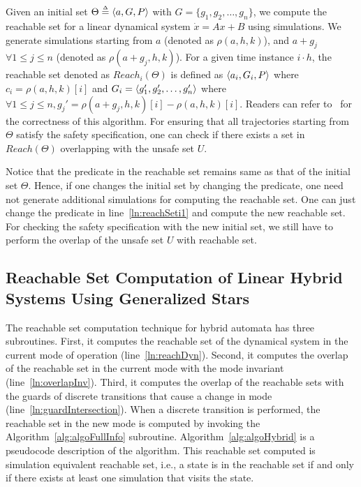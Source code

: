 Given an initial set $\Theta \deq \tup{a, G, P}$ with $G = \{g_1, g_2, \ldots, g_n\}$, we compute the reachable set for a linear dynamical system $\dot{x} = Ax + B$ using simulations.
%
We generate simulations starting from $a$ (denoted as $\rho(a, h, k)$), and $a+g_j$ $\forall 1\leq j \leq n$ (denoted as $\rho(a+g_j, h, k)$). 
%
For a given time instance $i\cdot h$, the reachable set denoted as $Reach_i(\Theta)$ is defined as $\tup{a_i, G_i, P}$ where $c_i = \rho(a, h, k)[i]$ and $G_i = \tup{g_1', g_2', \ldots, g_n'}$ where $\forall 1\leq j \leq n, g_j' = \rho(a+g_j, h, k)[i] - \rho(a, h, k)[i]$. 
%
Readers can refer to~\cite{bak2017tacas} for the correctness of this algorithm.
%
For ensuring that all trajectories starting from $\Theta$ satisfy the safety specification, one can check if there exists a set in $Reach(\Theta)$ overlapping with the unsafe set $U$.
%

\begin{remark}
\label{rem:predConst}
Notice that the predicate in the reachable set remains same as that of the initial set $\Theta$. Hence, if one changes the initial set by changing the predicate, one need not generate additional simulations for computing the reachable set. One can just change the predicate in line~\ref{ln:reachSeti1} and compute the new reachable set. For checking the safety specification with the new initial set, we still have to perform the overlap of the unsafe set $U$ with reachable set.
\end{remark}

\subsection{Reachable Set Computation of Linear Hybrid Systems Using Generalized Stars}
%
The reachable set computation technique for hybrid automata has three subroutines.
%
First, it computes the reachable set of the dynamical system in the current mode of operation (line~\ref{ln:reachDyn}).
%
Second, it computes the overlap of the reachable set in the current mode with the mode invariant (line~\ref{ln:overlapInv}).
%
Third, it computes the overlap of the reachable sets with the guards of discrete transitions that cause a change in mode (line~\ref{ln:guardIntersection}).
%
When a discrete transition is performed, the reachable set in the new mode is computed by invoking the Algorithm~\ref{alg:algoFullInfo} subroutine.
%
Algorithm~\ref{alg:algoHybrid} is a pseudocode description of the algorithm. This reachable set computed is simulation equivalent reachable set, i.e., a state is in the reachable set if and only if there exists at least one simulation that visits the state.

